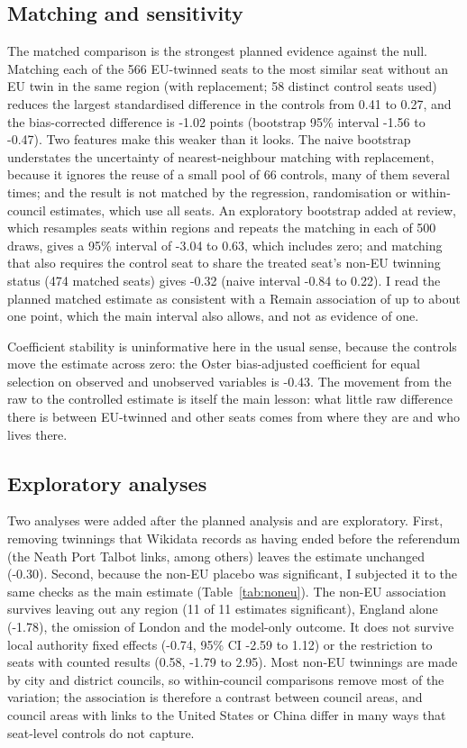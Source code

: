 \documentclass[11pt,a4paper]{article}
\begin{document}
\subsection{Matching and sensitivity}
The matched comparison is the strongest planned evidence against the null. Matching each of the 566 EU-twinned seats to the most similar seat without an EU twin in the same region (with replacement; 58 distinct control seats used) reduces the largest standardised difference in the controls from 0.41 to 0.27, and the bias-corrected difference is -1.02 points (bootstrap 95\% interval -1.56 to -0.47). Two features make this weaker than it looks. The naive bootstrap understates the uncertainty of nearest-neighbour matching with replacement, because it ignores the reuse of a small pool of 66 controls, many of them several times; and the result is not matched by the regression, randomisation or within-council estimates, which use all seats. An exploratory bootstrap added at review, which resamples seats within regions and repeats the matching in each of 500 draws, gives a 95\% interval of -3.04 to 0.63, which includes zero; and matching that also requires the control seat to share the treated seat's non-EU twinning status (474 matched seats) gives -0.32 (naive interval -0.84 to 0.22). I read the planned matched estimate as consistent with a Remain association of up to about one point, which the main interval also allows, and not as evidence of one.

Coefficient stability is uninformative here in the usual sense, because the controls move the estimate across zero: the Oster bias-adjusted coefficient for equal selection on observed and unobserved variables is -0.43. The movement from the raw to the controlled estimate is itself the main lesson: what little raw difference there is between EU-twinned and other seats comes from where they are and who lives there.

\subsection{Exploratory analyses}
Two analyses were added after the planned analysis and are exploratory. First, removing twinnings that Wikidata records as having ended before the referendum (the Neath Port Talbot links, among others) leaves the estimate unchanged (-0.30). Second, because the non-EU placebo was significant, I subjected it to the same checks as the main estimate (Table~\ref{tab:noneu}). The non-EU association survives leaving out any region (11 of 11 estimates significant), England alone (-1.78), the omission of London and the model-only outcome. It does not survive local authority fixed effects (-0.74, 95\% CI -2.59 to 1.12) or the restriction to seats with counted results (0.58, -1.79 to 2.95). Most non-EU twinnings are made by city and district councils, so within-council comparisons remove most of the variation; the association is therefore a contrast between council areas, and council areas with links to the United States or China differ in many ways that seat-level controls do not capture.
\end{document}
